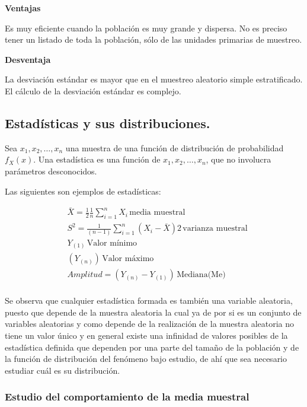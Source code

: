 \textbf{Ventajas}

Es muy eficiente cuando la población es muy grande y dispersa.
No es preciso tener un listado de toda la población,
sólo de las unidades primarias de muestreo.

\textbf{Desventaja}

La desviación estándar es mayor que en el muestreo aleatorio simple estratificado. El cálculo de la desviación estándar es complejo.

\subsection{Estadísticas y sus distribuciones.}

\begin{definition}[Estadística]
    Sea $x_1,x_2,\dots ,x_n$ una muestra de una función de
    distribución de probabilidad $f_X(x)$. Una estadística es
    una función de $x_1,x_2,\dots ,x_n$, que no involucra
    parámetros desconocidos.
\end{definition}


Las siguientes son ejemplos de estadísticas:

\begin{align*}
     & \bar{X}=\frac{1}{2}\frac{1}{n}\sum_{i=1}^n X_i \,\text{media muestral}      \\
     & S^2=\frac{1}{(n-1)} \sum_{i=1}^n (X_i-\bar{X} )2 \,\text{varianza muestral} \\
     & Y_{(1)} \,\text{Valor mínimo}                                               \\
     & \left(Y_{(n)}\right) \,\text{Valor máximo}                                  \\
     & Amplitud=\left(Y_{(n)}-Y_{( 1)}\right)\,\text{Mediana(Me)}                  \\
\end{align*}

Se observa que cualquier estadística formada es también
una variable aleatoria, puesto que depende de la muestra aleatoria la cual ya de
por si es un conjunto de variables aleatorias y como depende de la realización de
la muestra aleatoria no tiene un valor único y en general existe una infinidad de
valores posibles de la estadística definida que dependen por una parte del tamaño
de la población y de la función de distribución del fenómeno bajo estudio, de ahí
que sea necesario estudiar cuál es su distribución.


\subsubsection{Estudio del comportamiento de la media muestral}

